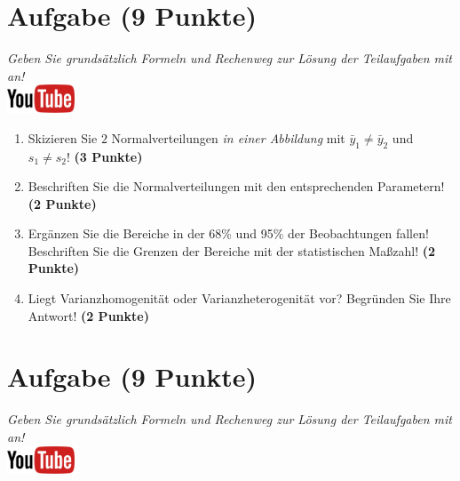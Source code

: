 \documentclass[a4paper, 9pt]{scrartcl}\usepackage[]{graphicx}\usepackage[]{xcolor}
\begin{document}
 
\clearpage

\section{Aufgabe \hfill (9 Punkte)}

\textit{Geben Sie grunds{\"a}tzlich Formeln und Rechenweg zur L{\"o}sung der
  Teilaufgaben mit an!} \\[1Ex]

\hfill\href{https://youtu.be/ZrJhn2wPbq4}{\includegraphics[width =
  2cm]{img/youtube}}\\[1Ex]



\begin{enumerate}
\item Skizieren Sie $2$ Normalverteilungen \textit{in einer
    Abbildung} mit $\bar{y}_1 \neq \bar{y}_2$ und $s_1 \neq s_2$! \textbf{(3 Punkte)}
\item Beschriften Sie die Normalverteilungen mit den entsprechenden
  Parametern! \textbf{(2 Punkte)}
\item Erg{\"a}nzen Sie die Bereiche in der 68\% und 95\% der Beobachtungen
  fallen! Beschriften Sie die Grenzen der Bereiche mit der statistischen Ma{\ss}zahl! \textbf{(2 Punkte)}
\item Liegt Varianzhomogenit{\"a}t oder Varianzheterogenit{\"a}t vor? Begr{\"u}nden Sie
  Ihre Antwort! \textbf{(2 Punkte)}
\end{enumerate}

 
\clearpage

\section{Aufgabe \hfill (9 Punkte)}

\textit{Geben Sie grunds{\"a}tzlich Formeln und Rechenweg zur L{\"o}sung der
  Teilaufgaben mit an!} \\[1Ex]

\hfill\href{https://youtu.be/MiD42k4l5Ag}{\includegraphics[width =
  2cm]{img/youtube}}\\[1Ex]
\end{document}
